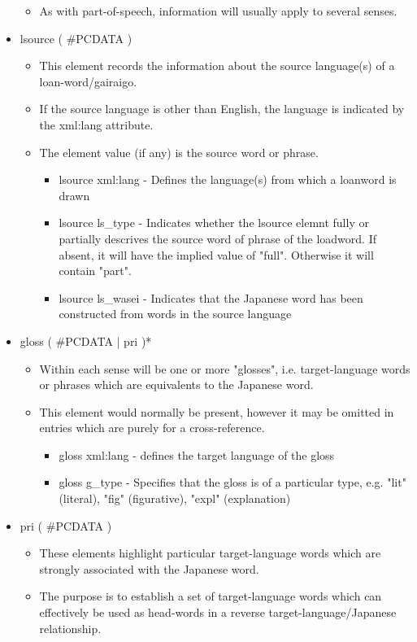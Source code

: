 \documentclass[11pt]{article}
\begin{document}
\begin{itemize}
\begin{itemize}
\item As with part-of-speech, information will usually apply to several senses.
\end{itemize}
\item lsource ( \#PCDATA )
\begin{itemize}
\item This element records the information about the source language(s) of a loan-word/gairaigo.
\item If the source language is other than English, the language is indicated by the xml:lang attribute.
\item The element value (if any) is the source word or phrase.
\begin{itemize}
\item lsource xml:lang - Defines the language(s) from which a loanword is drawn
\item lsource ls\_type - Indicates whether the lsource elemnt fully or partially descrives the source word of phrase of the loadword. If absent, it will have the implied value of "full". Otherwise it will contain "part".
\item lsource ls\_wasei - Indicates that the Japanese word has been constructed from words in the source language
\end{itemize}
\end{itemize}
\item gloss ( \#PCDATA | pri )*
\begin{itemize}
\item Within each sense will be one or more "glosses", i.e. target-language words or phrases which are equivalents to the Japanese word.
\item This element would normally be present, however it may be omitted in entries which are purely for a cross-reference.
\begin{itemize}
\item gloss xml:lang - defines the target language of the gloss
\item gloss g\_type - Specifies that the gloss is of a particular type, e.g. "lit" (literal), "fig" (figurative), "expl" (explanation)
\end{itemize}
\end{itemize}
\item pri ( \#PCDATA )
\begin{itemize}
\item These elements highlight particular target-language words which are strongly associated with the Japanese word.
\item The purpose is to establish a set of target-language words which can effectively be used as head-words in a reverse target-language/Japanese relationship.

\end{itemize}
\end{itemize}
\end{document}
